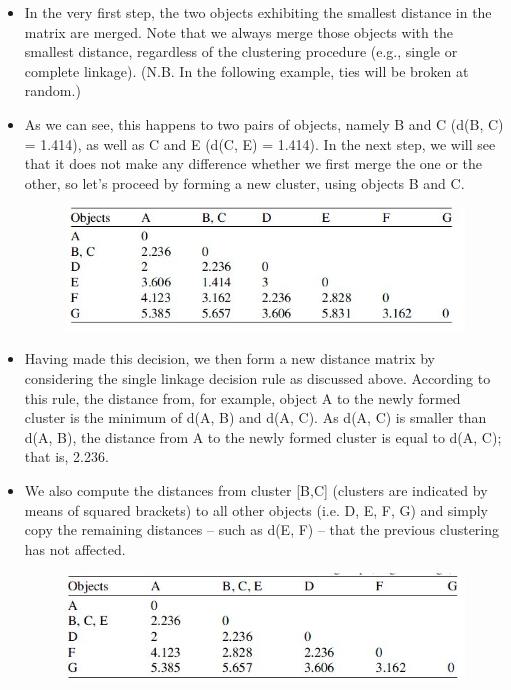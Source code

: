 \documentclass[a4paper,12pt]{article}
\begin{document}
\begin{itemize}
	\item In the very first step, the two
	objects exhibiting the smallest distance in the matrix are merged. Note that we
	always merge those objects with the smallest distance, regardless of the clustering
	procedure (e.g., single or complete linkage). (N.B. In the following example, ties will be broken at random.)
	\item As we can see, this happens to two
	pairs of objects, namely B and C (d(B, C) = 1.414), as well as C and E (d(C, E) =
	1.414). In the next step, we will see that it does not make any difference whether we
	first merge the one or the other, so let’s proceed by forming a new cluster, using
	objects B and C.
	\begin{figure}[h!]
		\begin{center}
			\includegraphics[scale=0.6]{images/DistanceMatrix2.jpg}\\
		\end{center}
	\end{figure}
	\item Having made this decision, we then form a new distance matrix by considering
	the single linkage decision rule as discussed above. According to this rule, the
	distance from, for example, object A to the newly formed cluster is the minimum of
	d(A, B) and d(A, C). As d(A, C) is smaller than d(A, B), the distance from A to the
	newly formed cluster is equal to d(A, C); that is, 2.236.
	\item We also compute the
	distances from cluster [B,C] (clusters are indicated by means of squared brackets)
	to all other objects (i.e. D, E, F, G) and simply copy the remaining distances – such
	as d(E, F) – that the previous clustering has not affected.
	\begin{figure}[h!]
		\begin{center}
			\includegraphics[scale=0.6]{images/DistanceMatrix3.jpg}\\

\end{center}
\end{figure}
\end{itemize}
\end{document}
